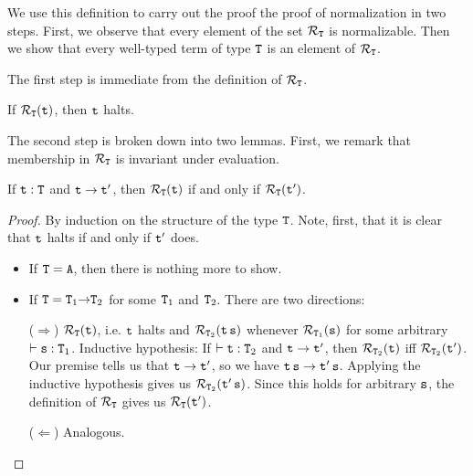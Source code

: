 \documentclass[11pt,twoside=off,numbers=noenddot]{scrbook}
\begin{document}
We use this definition to carry out the proof the proof of
normalization in two steps. First, we observe that every element of
the set $\mathcal{R}_{\texttt{T}}$ is normalizable. Then we show that
every well-typed term of type $\texttt{T}$ is an element of $\mathcal{R}_{\texttt{T}}$.

The first step is immediate from the definition of $\mathcal{R}_{\texttt{T}}$.

\begin{lemma}
  If $\mathcal{R}_{\texttt{T}}(\texttt{t})$, then $\texttt{t}$ halts.
\end{lemma}

The second step is broken down into two lemmas. First, we remark that
membership in $\mathcal{R}_{\texttt{T}}$ is invariant under evaluation.

\begin{lemma}
  If $\texttt{t} : \texttt{T}$ and $\texttt{t} \rightarrow \texttt{t}'$, then
  $\mathcal{R}_{\texttt{T}}(\texttt{t})$ if and only if
  $\mathcal{R}_{\texttt{T}}(\texttt{t}')$.
\end{lemma}

\begin{proof}
  By induction on the structure of the type $\texttt{T}$. Note, first,
  that it is clear that $\texttt{t}$ halts if and only if $\texttt{t}'$ does.
  \begin{itemize}
    \item If $\texttt{T} = \texttt{A}$, then there is nothing more to show.
    \item If $\texttt{T} = \texttt{$\texttt{T}_1$$\rightarrow$$\texttt{T}_2$}$ for
      some $\texttt{T}_1$ and $\texttt{T}_2$. There are two directions:

      ($\Rightarrow$) $\mathcal{R}_{\texttt{T}}(\texttt{t})$, i.e. $\texttt{t}$ halts
      and $\mathcal{R}_{\texttt{T}_2}(\texttt{t\,s})$ whenever
      $\mathcal{R}_{\texttt{T}_1}(\texttt{s})$ for some arbitrary $\vdash
      \texttt{s} : \texttt{T}_1$. Inductive hypothesis: If $\vdash \texttt{t}
      : \texttt{T}_2$ and $\texttt{t} \rightarrow \texttt{t}'$, then
      $\mathcal{R}_{\texttt{T}_2}(\texttt{t})$ iff
      $\mathcal{R}_{\texttt{T}_2}(\texttt{t}')$. Our premise tells us that
      $\texttt{t} \rightarrow \texttt{t}'$, so we have $\texttt{t\,s}
      \rightarrow \texttt{$\texttt{t}'$\,s}$. Applying the inductive
      hypothesis gives us
      $\mathcal{R}_{\texttt{T}_2}(\texttt{$\texttt{t}'$\,s})$. Since this
      holds for arbitrary $\texttt{s}$, the definition of
      $\mathcal{R}_{\texttt{T}}$ gives us $\mathcal{R}_{\texttt{T}}(\texttt{t}')$.

      ($\Leftarrow$) Analogous.
  \end{itemize}
\end{proof}
\end{document}
